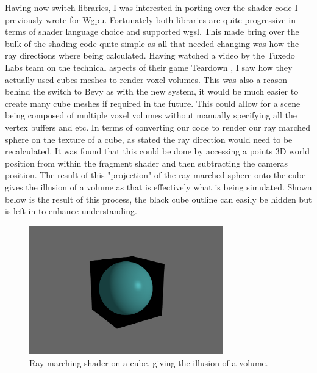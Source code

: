 \documentclass[titlepage]{article}
\begin{document}
Having now switch libraries, I was interested in porting over the shader code I previously wrote for Wgpu. Fortunately both libraries are quite progressive in terms of shader language choice and supported \acrshort{wgsl}. This made bring over the bulk of the shading code quite simple as all that needed changing was how the ray directions where being calculated. Having watched a video by the Tuxedo Labs team on the technical aspects of their game Teardown \cite{teardown:tech}, I saw how they actually used cubes meshes to render voxel volumes. This was also a reason behind the switch to Bevy as with the new system, it would be much easier to create many cube meshes if required in the future. This could allow for a scene being composed of multiple voxel volumes without manually specifying all the vertex buffers and etc. In terms of converting our code to render our ray marched sphere on the texture of a cube, as stated the ray direction would need to be recalculated. It was found that this could be done by accessing a points 3D world position from within the fragment shader and then subtracting the cameras position. The result of this "projection" of the ray marched sphere onto the cube gives the illusion of a volume as that is effectively what is being simulated. Shown below is the result of this process, the black cube outline can easily be hidden but is left in to enhance understanding.

\begin{figure}[htp]
    \centering
    \includegraphics[width=0.75\textwidth]{cube.png}
    \caption{Ray marching shader on a cube, giving the illusion of a volume.}
\end{figure}
\FloatBarrier
\end{document}
